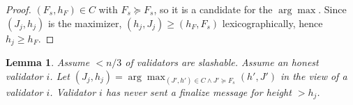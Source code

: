 \ifx\litemode\undefined\documentclass{article}\fi
\newcommand{\finalize}{\mathsf{finalize}}
\theoremstyle{plain}
\newtheorem{lemma}{Lemma}
\theoremstyle{definition}
\theoremstyle{remark}
\begin{document}
\begin{proof}
$(F_s, h_F) \in C$ with $F_s \succeq F_s$, so it is a candidate for the $\arg\max$.
Since $(J_j, h_j)$ is the maximizer, $(h_j, J_j) \geq (h_F, F_s)$ lexicographically, hence $h_j \geq h_F$.
\end{proof}







\begin{lemma}
  Assume $< n/3$ of validators are slashable.
  Assume an honest validator $i$.
  Let $(J_j, h_j) = \arg\max_{(J',h')\in C \land J' \succeq F_s}(h', J')$ in the view of a validator $i$.
  Validator $i$ has never sent a finalize message for height $>h_j$.
\end{lemma}
\end{document}
